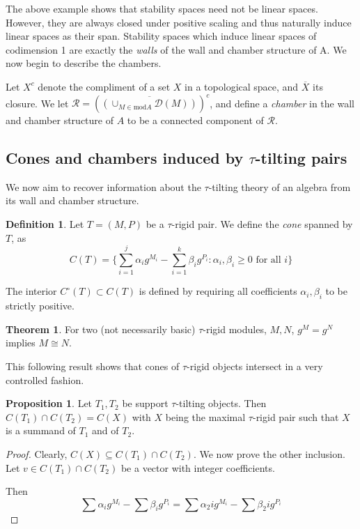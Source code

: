 \documentclass[]{article}
\theoremstyle{definition}
\newtheorem{definition}{Definition}[section]
\newtheorem{theorem}{Theorem}[section]
\newtheorem{proposition}{Proposition}[section]
\newcommand{\tu}{\ensuremath{\tau}}
\begin{document}
The above example shows that stability spaces need not be linear spaces. However, they are always closed under positive scaling and thus naturally induce linear spaces as their span. Stability spaces which induce linear spaces of codimension 1 are exactly the \textit{walls} of the wall and chamber structure of A. We now begin to describe the chambers.

Let $X^c$ denote the compliment of a set $X$ in a topological space, and $\overline{X}$ its closure. We let $\mathcal{R} = (\overline{(\cup_{M \in \text{mod} A} \mathcal{D}(M))})^c$, and define a \textit{chamber} in the wall and chamber structure of $A$ to be a connected component of $\mathcal{R}$.

\subsection{Cones and chambers induced by \tu-tilting pairs}
We now aim to recover information about the \tu-tilting theory of an algebra from its wall and chamber structure.

\begin{definition}
	Let $T = (M,P)$ be a \tu-rigid pair. We define the \textit{cone} spanned by $T$, as \[C(T) = \{\sum_{i = 1}^{j} \alpha_ig^{M_i} - \sum_{i = 1}^{k}\beta_ig^{P_i} : \alpha_i,\beta_i \geq 0 \text{ for all } i\}\]
	
	The interior $C^\circ(T) \subset C(T)$ is defined by requiring all coefficients $\alpha_i,\beta_i$ to be strictly positive.
\end{definition} 

\begin{theorem}\cite[Theorem 6.5, a)]{dij17}
	For two (not necessarily basic) $\tau$-rigid modules, $M,N$, $g^M = g^N$ implies $M \cong N$.
\end{theorem}

This following result shows that cones of $\tau$-rigid objects intersect in a very controlled fashion.

\begin{proposition}\cite[Corollary 6.7, b)]{dij17}
	Let $T_1,T_2$ be support \tu-tilting objects. Then $C(T_1) \cap C(T_2) = C(X)$ with $X$ being the maximal \tu-rigid pair such that $X$ is a summand of $T_1$ and of $T_2$.
\end{proposition}

\begin{proof}
	Clearly, $C(X) \subseteq C(T_1) \cap C(T_2)$. We now prove the other inclusion. Let $v \in C(T_1) \cap C(T_2)$ be a vector with integer coefficients. 
	
	Then \[\sum \alpha_ig^{M_i} - \sum \beta_ig^{P_i} = \sum \alpha_2 ig^{M_i} - \sum \beta_2 ig^{P_i}\]
	
\end{proof}
\end{document}
